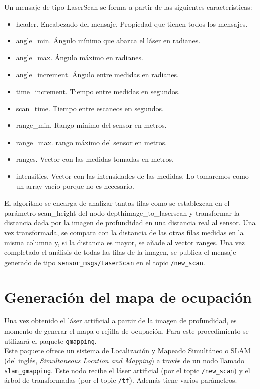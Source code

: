 Un mensaje de tipo LaserScan se forma a partir de las siguientes características:

\begin{itemize}

	\item header. Encabezado del mensaje. Propiedad que tienen todos los mensajes.
	\item angle\_min. Ángulo mínimo que abarca el láser en radianes.
	\item angle\_max. Ángulo máximo en radianes.
	\item angle\_increment. Ángulo entre medidas en radianes.
	\item time\_increment. Tiempo entre medidas en segundos.
	\item scan\_time. Tiempo entre escaneos en segundos.
	\item range\_min. Rango mínimo del sensor en metros.
	\item range\_max. rango máximo del sensor en metros.
	\item ranges. Vector con las medidas tomadas en metros.
	\item intensities. Vector con las intensidades de las medidas. Lo tomaremos como un array vacío porque no es necesario.

\end{itemize}

El algoritmo se encarga de analizar tantas filas como se establezcan en el parámetro scan\_height del nodo depthimage\_to\_laserscan y transformar la distancia dada por la imagen de profundidad en una distancia real al sensor. Una vez transformada, se compara con la distancia de las otras filas medidas en la misma columna y, si la distancia es mayor, se añade al vector ranges. Una vez completado el análisis de todas las filas de la imagen, se publica el mensaje generado de tipo \texttt{sensor\_msgs/LaserScan} en el topic \texttt{/new\_scan}.\\

\section{Generación del mapa de ocupación}

Una vez obtenido el láser artificial a partir de la imagen de profundidad, es momento de generar el mapa o rejilla de ocupación. Para este procedimiento se utilizará el paquete \texttt{gmapping}.\\

Este paquete ofrece un sistema de Localización y Mapeado Simultáneo o SLAM (del inglés, \textit{Simultaneous Location and Mapping}) a través de un nodo llamado \texttt{slam\_gmapping}. Este nodo recibe el láser artificial (por el topic \texttt{/new\_scan}) y el árbol de transformadas (por el topic \texttt{/tf}). Además tiene varios parámetros.\\

